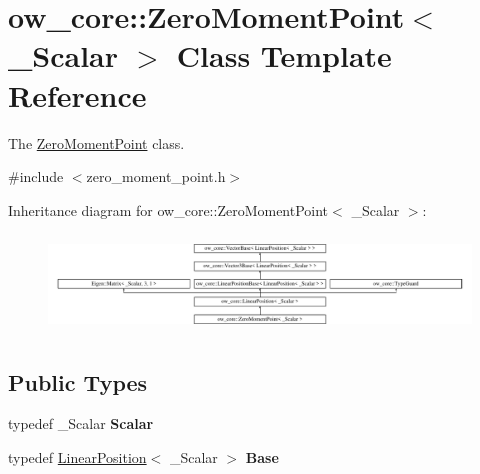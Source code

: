 \hypertarget{classow__core_1_1ZeroMomentPoint}{}\section{ow\+\_\+core\+:\+:Zero\+Moment\+Point$<$ \+\_\+\+Scalar $>$ Class Template Reference}
\label{classow__core_1_1ZeroMomentPoint}


The \hyperlink{classow__core_1_1ZeroMomentPoint}{Zero\+Moment\+Point} class.  




{\ttfamily \#include $<$zero\+\_\+moment\+\_\+point.\+h$>$}

Inheritance diagram for ow\+\_\+core\+:\+:Zero\+Moment\+Point$<$ \+\_\+\+Scalar $>$\+:\begin{figure}[H]
\begin{center}
\leavevmode
\includegraphics[height=2.629108cm]{d5/da5/classow__core_1_1ZeroMomentPoint}
\end{center}
\end{figure}
\subsection*{Public Types}
\begin{DoxyCompactItemize}
\item 
typedef \+\_\+\+Scalar {\bfseries Scalar}\hypertarget{classow__core_1_1ZeroMomentPoint_ad6a3215f1a2f8793a92b6842954835d6}{}\label{classow__core_1_1ZeroMomentPoint_ad6a3215f1a2f8793a92b6842954835d6}

\item 
typedef \hyperlink{classow__core_1_1LinearPosition}{Linear\+Position}$<$ \+\_\+\+Scalar $>$ {\bfseries Base}\hypertarget{classow__core_1_1ZeroMomentPoint_a4d6d13fa0aee3c4fb3b19c292e570fc5}{}\label{classow__core_1_1ZeroMomentPoint_a4d6d13fa0aee3c4fb3b19c292e570fc5}

\end{DoxyCompactItemize}
